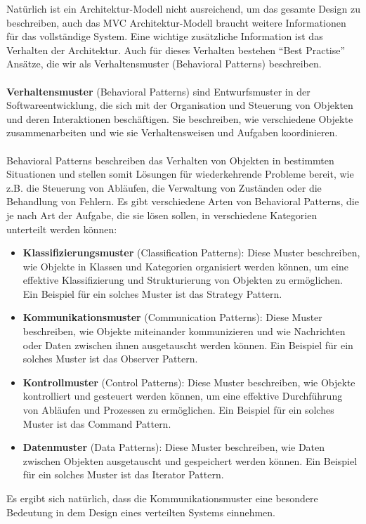 \documentclass[../vs-script-first-v01.tex]{subfiles}
\begin{document}
Natürlich ist ein Architektur-Modell nicht ausreichend, um das gesamte Design zu beschreiben, auch das MVC Architektur-Modell braucht weitere Informationen für das vollständige System. Eine wichtige zusätzliche Information ist das Verhalten der Architektur. Auch für dieses Verhalten bestehen \enquote{Best Practise} Ansätze, die wir als Verhaltensmuster (Behavioral Patterns) beschreiben. 
\\\\
\textbf{Verhaltensmuster} (Behavioral Patterns) sind Entwurfsmuster in der Softwareentwicklung, die sich mit der Organisation und Steuerung von Objekten und deren Interaktionen beschäftigen. Sie beschreiben, wie verschiedene Objekte zusammenarbeiten und wie sie Verhaltensweisen und Aufgaben koordinieren.
\\\\
Behavioral Patterns beschreiben das Verhalten von Objekten in bestimmten Situationen und stellen somit Lösungen für wiederkehrende Probleme bereit, wie z.B. die Steuerung von Abläufen, die Verwaltung von Zuständen oder die Behandlung von Fehlern. Es gibt verschiedene Arten von Behavioral Patterns, die je nach Art der Aufgabe, die sie lösen sollen, in verschiedene Kategorien unterteilt werden können:
\begin{itemize}
\item \textbf{Klassifizierungsmuster} (Classification Patterns): Diese Muster beschreiben, wie Objekte in Klassen und Kategorien organisiert werden können, um eine effektive Klassifizierung und Strukturierung von Objekten zu ermöglichen. Ein Beispiel für ein solches Muster ist das Strategy Pattern.
\item \textbf{Kommunikationsmuster} (Communication Patterns): Diese Muster beschreiben, wie Objekte miteinander kommunizieren und wie Nachrichten oder Daten zwischen ihnen ausgetauscht werden können. Ein Beispiel für ein solches Muster ist das Observer Pattern.
\item \textbf{Kontrollmuster} (Control Patterns): Diese Muster beschreiben, wie Objekte kontrolliert und gesteuert werden können, um eine effektive Durchführung von Abläufen und Prozessen zu ermöglichen. Ein Beispiel für ein solches Muster ist das Command Pattern.
\item \textbf{Datenmuster} (Data Patterns): Diese Muster beschreiben, wie Daten zwischen Objekten ausgetauscht und gespeichert werden können. Ein Beispiel für ein solches Muster ist das Iterator Pattern.
\end{itemize}
Es ergibt sich natürlich, dass die Kommunikationsmuster eine besondere Bedeutung in dem Design eines verteilten Systems einnehmen. 
\end{document}
